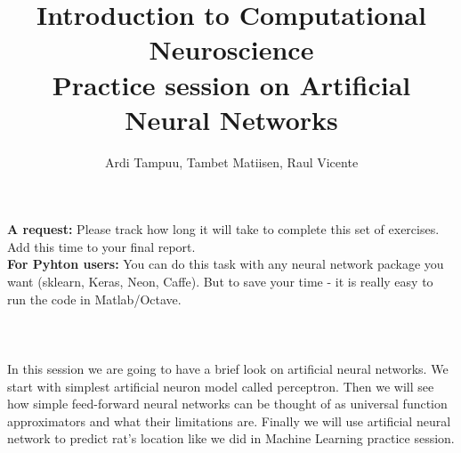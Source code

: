 \documentclass[a4paper,11pt]{article}
\author{\large{Ardi Tampuu, Tambet Matiisen, Raul Vicente}}
\title{\huge{Introduction to Computational Neuroscience}\\\LARGE{Practice session on Artificial Neural Networks}}
\begin{document}
\maketitle

\textbf{A request:} Please track how long it will take to complete this set of exercises. Add this time to your final report.
\ \\

\textbf{For Pyhton users:} You can do this task with any neural network package you want (sklearn, Keras, Neon, Caffe). But to save your time - it is really easy to run the code in Matlab/Octave.\\
\ \\
\ \\
\ \\
%
%
In this session we are going to have a brief look on artificial neural networks. We start with simplest artificial neuron model called perceptron. Then we will see how simple feed-forward neural networks can be thought of as universal function approximators and what their limitations are. Finally we will use artificial neural network to predict rat's location like we did in Machine Learning practice session.
\end{document}
